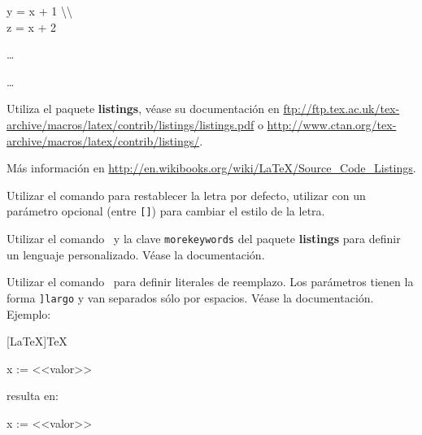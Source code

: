 \espaciodoble

{}{y = x + 1 \textbackslash\textbackslash\\ z = x + 2}


\newpage

{\pa[lenguaje]}{\ldots}

{\pa[título]\pa[etiqueta]\pa[lenguaje]}{\ldots}

\sloppy
Utiliza el paquete \textbf{listings}, véase su documentación en \url{ftp://ftp.tex.ac.uk/tex-archive/macros/latex/contrib/listings/listings.pdf}
o \url{http://www.ctan.org/tex-archive/macros/latex/contrib/listings/}.

Más información en \url{http://en.wikibooks.org/wiki/LaTeX/Source_Code_Listings}.

Utilizar el comando  para restablecer la letra por defecto, utilizar con un parámetro opcional (entre \texttt{[]}) para cambiar el estilo de la letra.

Utilizar el comando \pa\pa\ y la clave \texttt{morekeywords} del paquete \textbf{listings} para definir un lenguaje personalizado. Véase la documentación.

Utilizar el comando \pa\ para definir literales de reemplazo. Los parámetros tienen la forma \texttt{\pa[match]\pa[\pa[reemplazo]]largo} y van separados sólo por espacios. Véase la documentación. Ejemplo:


\begin{listado}{[LaTeX]TeX}
\begin{listado~}{}
 x := <<valor>>
\end{listado~}
\end{listado}

\vspace{-16pt}\noindent
resulta en:
\vspace{-12pt}


\begin{listado}{}
 x := <<valor>>
\end{listado}


